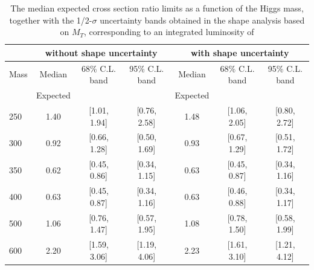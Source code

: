 \begin{table}
\begin{center}
{\normalsize
\begin{tabular}{|l|c|c|c|c|c|c|}
\hline
      &  \multicolumn{3}{c|}{ without shape uncertainty} &\multicolumn{3}{c|}{ with shape uncertainty} \\
\hline
Mass  &  Median      &     68\% C.L. band &  95\% C.L. band &  Median	   &	 68\% C.L. band &  95\% C.L. band\\
      &  Expected    &                    &                 &  Expected    &			&		 \\
\hline
250 & 1.40 & [1.01, 1.94] & [0.76, 2.58] & 1.48 & [1.06, 2.05] & [0.80, 2.72] \\
300 & 0.92 & [0.66, 1.28] & [0.50, 1.69] & 0.93 & [0.67, 1.29] & [0.51, 1.72] \\
350 & 0.62 & [0.45, 0.86] & [0.34, 1.15] & 0.63 & [0.45, 0.87] & [0.34, 1.16] \\
400 & 0.63 & [0.45, 0.87] & [0.34, 1.16] & 0.63 & [0.46, 0.88] & [0.34, 1.17] \\
500 & 1.06 & [0.76, 1.47] & [0.57, 1.95] & 1.08 & [0.78, 1.50] & [0.58, 1.99] \\
600 & 2.20 & [1.59, 3.06] & [1.19, 4.06] & 2.23 & [1.61, 3.10] & [1.21, 4.12] \\
\hline
\end{tabular}
}
\end{center}
\caption{The median expected cross section ratio limits as a function 
of the Higgs mass, together with the 1/2-$\sigma$ uncertainty bands obtained in the shape analysis based on $M_T$, 
corresponding to an integrated luminosity of \intlumi}
\label{tab:limits_mtshape_5fb}
\end{table}

